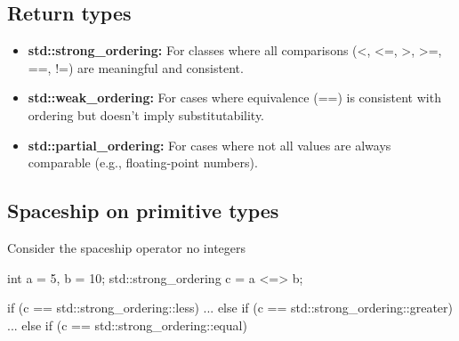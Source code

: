 \documentclass{report}
\begin{document}
\bigbreak \noindent 
\subsection{Return types}
\bigbreak \noindent 
\begin{itemize}
    \item \textbf{std::strong\_ordering:} For classes where all comparisons (<, <=, >, >=, ==, !=) are meaningful and consistent.
    \item \textbf{std::weak\_ordering:} For cases where equivalence (==) is consistent with ordering but doesn't imply substitutability.
    \item \textbf{std::partial\_ordering:} For cases where not all values are always comparable (e.g., floating-point numbers).
\end{itemize}

\bigbreak \noindent 
\subsection{Spaceship on primitive types}
\bigbreak \noindent 
Consider the spaceship operator no integers
\bigbreak \noindent 
\begin{cppcode}
int a = 5, b = 10;
std::strong_ordering c = a <=> b;

if (c == std::strong_ordering::less) {
    ...
} else if (c == std::strong_ordering::greater) {
    ...
} else if (c == std::strong_ordering::equal)
\end{cppcode}
\end{document}
